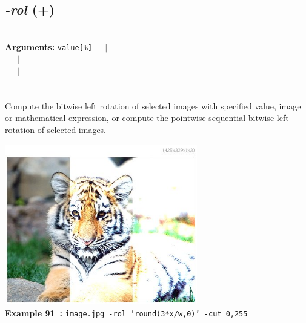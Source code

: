 \documentclass[a4paper,11pt,twoside]{book}
\begin{document}
\subsection{\emph{-rol} (+)}\vspace*{-0.5em}
~\\\textbf{Arguments: } 
{\small \texttt{value[\%]}}~~~$|$\\
\hspace*{2.2cm}{\small \texttt{[image]}}~~~$|$\\
~~~$|$\\
\\~\\
Compute the bitwise left rotation of selected images with specified value, image or
mathematical expression, or compute the pointwise sequential bitwise left rotation of
selected images.
\begin{center}\includegraphics[keepaspectratio=true,height=7cm,width=\textwidth]{img/gmic_def91.jpg}\\
{\footnotesize \textbf{Example 91~:} \texttt{image.jpg -rol 'round(3*x/w,0)' -cut 0,255}}
\end{center}
\end{document}
